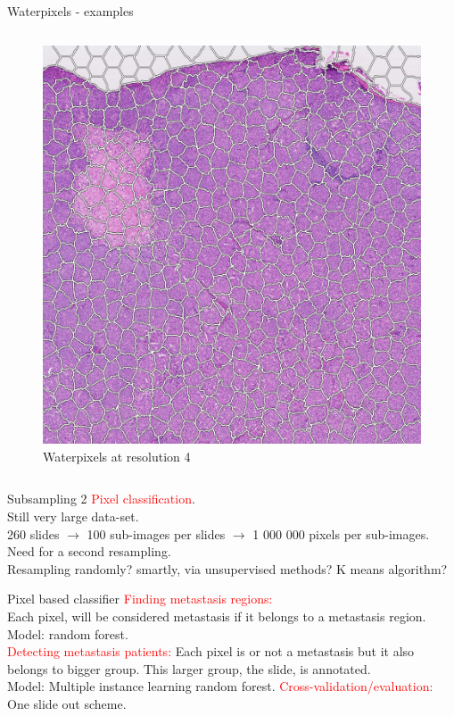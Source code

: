 \documentclass{beamer}
\begin{document}
\begin{frame}[noframenumbering]{Waterpixels - examples}
\begin{columns}[T]
\begin{column}{.3\textwidth}
\begin{figure}[!ht]
\centering
\includegraphics[width=\textwidth]{waterpix_res4.png}
\caption{Waterpixels at resolution 4}
\label{}
\end{figure}
\end{column}%

\end{columns}
\end{frame}

\begin{frame}[noframenumbering]{Subsampling 2}
\textcolor{red}{Pixel classification}. \\
Still very large data-set. \\
260 slides $\rightarrow$ 100 sub-images per slides $\rightarrow$ 1 000 000 pixels per sub-images. \\
Need for a second resampling. \\
Resampling randomly? smartly, via unsupervised methods? K means algorithm? 
\end{frame}

\begin{frame}[noframenumbering]{Pixel based classifier}
\textcolor{red}{Finding metastasis regions:}\\
Each pixel, will be considered metastasis if it belongs to a metastasis region. \\
Model: random forest. \\
\textcolor{red}{Detecting metastasis patients:}
Each pixel is or not a metastasis but it also belongs to bigger group. This larger group, the slide, is annotated. \\
Model: Multiple instance learning random forest.
\textcolor{red}{Cross-validation/evaluation:} \\
One slide out scheme.
\end{frame}
\end{document}
